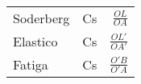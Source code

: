 \documentclass[11pt,a4paper]{article}
\begin{document}
\begin{multicols}{2}
\begin{cajita}
\vspace*{0.2cm}
\begin{tabular}{l c r}	
	Soderberg&Cs&$\frac{OL}{OA}$\\[0.2cm]
	Elastico&Cs&$\frac{OL'}{OA'}$\\[0.2cm]
	Fatiga&Cs&$\frac{O'B}{O'A}$\\[0.2cm]
\end{tabular}
	\end{cajita}
	\end{multicols}
\end{document}
